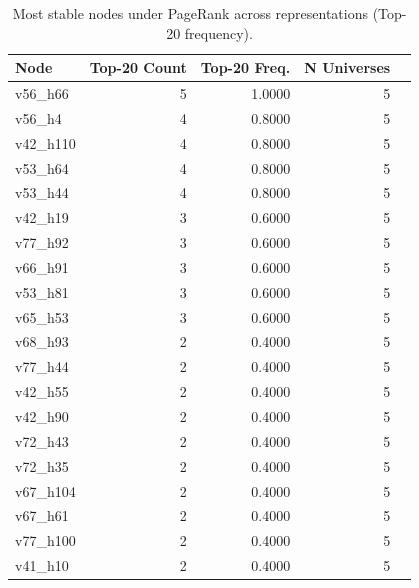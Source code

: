 \begin{table}
\caption{Most stable nodes under PageRank across representations (Top-20 frequency).}
\label{tab:pagerank_stability}
\begin{tabular}{lrrrr}
\toprule
Node & Top-20 Count & Top-20 Freq. & N Universes \\
\midrule
v56\_h66 & 5 & 1.0000 & 5 \\
v56\_h4 & 4 & 0.8000 & 5 \\
v42\_h110 & 4 & 0.8000 & 5 \\
v53\_h64 & 4 & 0.8000 & 5 \\
v53\_h44 & 4 & 0.8000 & 5 \\
v42\_h19 & 3 & 0.6000 & 5 \\
v77\_h92 & 3 & 0.6000 & 5 \\
v66\_h91 & 3 & 0.6000 & 5 \\
v53\_h81 & 3 & 0.6000 & 5 \\
v65\_h53 & 3 & 0.6000 & 5 \\
v68\_h93 & 2 & 0.4000 & 5 \\
v77\_h44 & 2 & 0.4000 & 5 \\
v42\_h55 & 2 & 0.4000 & 5 \\
v42\_h90 & 2 & 0.4000 & 5 \\
v72\_h43 & 2 & 0.4000 & 5 \\
v72\_h35 & 2 & 0.4000 & 5 \\
v67\_h104 & 2 & 0.4000 & 5 \\
v67\_h61 & 2 & 0.4000 & 5 \\
v77\_h100 & 2 & 0.4000 & 5 \\
v41\_h10 & 2 & 0.4000 & 5 \\
\bottomrule
\end{tabular}
\end{table}
